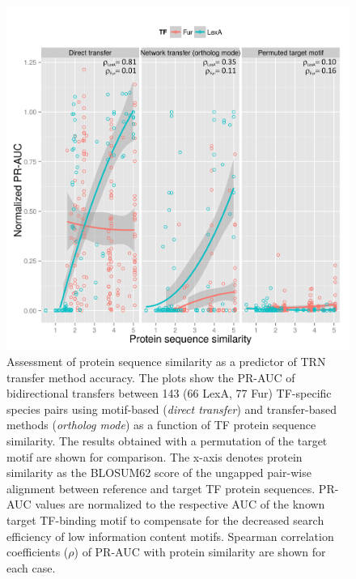 \begin{figure}
  \centering
  \includegraphics[width=\textwidth]{figures/chapter3/protein-sequence-similarity}
  \caption{Assessment of protein sequence similarity as a predictor of TRN
    transfer method accuracy. The plots show the PR-AUC of bidirectional
    transfers between 143 (66 LexA, 77 Fur) TF-specific species pairs using
    motif-based (\textit{direct transfer}) and transfer-based methods
    (\textit{ortholog mode}) as a function of TF protein sequence
    similarity. The results obtained with a permutation of the target motif are
    shown for comparison. The x-axis denotes protein similarity as the BLOSUM62
    score of the ungapped pair-wise alignment between reference and target TF
    protein sequences. PR-AUC values are normalized to the respective AUC of
    the known target TF-binding motif to compensate for the decreased search
    efficiency of low information content motifs. Spearman correlation
    coefficients ($\rho$) of PR-AUC with protein similarity are shown for each
    case.}
\label{fig:protein-sequence-similarity}
\end{figure}

